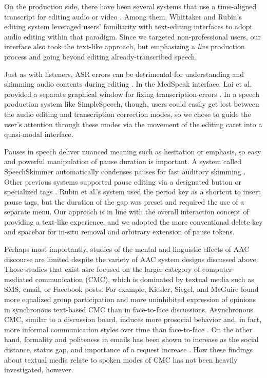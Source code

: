 On the production side, there have been several systems that use a time-aligned transcript for editing audio \cite{rubin,whittaker_semantic,yoon} or video \cite{Berthouzoz:2012,casares}. 
Among them, Whittaker and Rubin's editing system leveraged users' familiarity with text-editing interfaces to adopt audio editing within that paradigm. 
Since we targeted non-professional users, our interface also took the text-like approach, but emphasizing a \emph{live} production process and going beyond editing already-transcribed speech. 

Just as with listeners, ASR errors can be detrimental for understanding and skimming audio contents during editing \cite{halverson1999beauty}. 
In the MedSpeak interface, Lai et al. provided a separate graphical window for fixing transcription errors \cite{Lai:1997}. 
In a speech production system like SimpleSpeech, though, users could easily get lost between the audio editing and transcription correction modes, so we chose to guide the user's attention through these modes via the movement of the editing caret into a quasi-modal interface.

Pauses in speech deliver nuanced meaning such as hesitation or emphasis, so easy and powerful manipulation of pause duration is important. 
A system called SpeechSkimmer automatically condenses pauses for fast auditory skimming \cite{arons:1993}. 
Other previous systems supported pause editing via a designated button \cite{Berthouzoz:2012} or specialized tags \cite{rubin}. 
Rubin et al.'s system used the period key as a shortcut to insert pause tags, but the duration of the gap was preset and required the use of a separate menu. 
Our approach is in line with the overall interaction concept of providing a text-like experience, and we adopted the more conventional delete key and spacebar for in-situ removal and arbitrary extension of pause tokens.

Perhaps most importantly, studies of the mental and linguistic effects of AAC discourse are limited despite the variety of AAC system designs discussed above.
Those studies that exist asre focused on the larger category of computer-mediated communication (CMC), which is dominated by textual media such as SMS, email, or Facebook posts.
For example, Kiesler, Siegel, and McGuire \cite{kiesler} found more equalized group participation and more uninhibited expression of opinions in synchronous text-based CMC than in face-to-face discussions.
Asynchronous CMC, similar to a discussion board, induces more prosocial behavior and, in fact, more informal communication styles over time than face-to-face \cite{walther}.
On the other hand, formality and politeness in emails has been shown to increase as the social distance, status gap, and importance of a request increase \cite{cho}.
How these findings about textual media relate to spoken modes of CMC has not been heavily investigated, however.